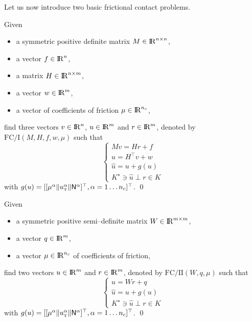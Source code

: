 Let us now introduce two basic frictional contact problems.
\begin{problem}\label{prob:I}
  Given
  \begin{itemize}
    \item a symmetric positive definite matrix ${M} \in \mathrm{I\!R}^{n \times n}$,
    \item a vector $ {f} \in \mathrm{I\!R}^n$,
    \item a matrix  ${H} \in \mathrm{I\!R}^{n \times m}$,
    \item a vector $w \in \mathrm{I\!R}^{m}$,
    \item a vector of coefficients of friction $\mu \in \mathrm{I\!R}^{n_c}$,
  \end{itemize}
find three vectors $ {v} \in \mathrm{I\!R}^n$, $u\in\mathrm{I\!R}^m$ and $r\in \mathrm{I\!R}^m$, denoted by $\mathrm{FC/I}(M,H,f,w,\mu)$  such that
\begin{equation}\label{eq:soccp1}
  \begin{cases}
    M v = {H} {r} + {f} \\[2mm]
    u = H^\top v + w \\[2mm]
    \hat u = u + g(u) \\[2mm]
    K^\star \ni {\hat u} \perp r \in K
  \end{cases}
\end{equation}
with $g(u) = [[\mu^\alpha  \|u^\alpha_{\hbox{\tiny{T}}}\| {\sf N}^\alpha]^\top, \alpha = 1\ldots n_c]^\top$. 
\qed
\end{problem}

\begin{problem}\label{prob:II}
  Given
  \begin{itemize}
    \item a symmetric positive semi--definite  matrix ${W} \in \mathrm{I\!R}^{m \times m}$,
    \item a vector $ {q} \in \mathrm{I\!R}^m$,
    \item a vector $\mu \in \mathrm{I\!R}^{n_c}$ of coefficients of friction, 
  \end{itemize}
find two vectors $u\in\mathrm{I\!R}^m$ and $r\in \mathrm{I\!R}^m$, denoted by $\mathrm{FC/II}(W,q,\mu)$  such that
\begin{equation}\label{eq:soccp2}
  \begin{cases}
    u =Wr +q \\[2mm]
    \hat u =u + g(u) \\[2mm]
    K^\star \ni {\hat u} \perp r \in K
  \end{cases}
\end{equation}
with $g(u) = [[\mu^\alpha  \|u^\alpha_{\hbox{\tiny{T}}}\| {\sf N}^\alpha]^\top, \alpha = 1\ldots n_c]^\top$.
\qed
\end{problem}



